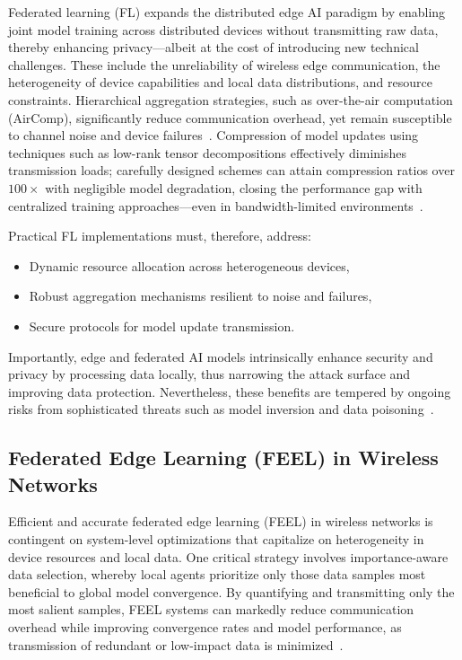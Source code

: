 Federated learning (FL) expands the distributed edge AI paradigm by enabling joint model training across distributed devices without transmitting raw data, thereby enhancing privacy—albeit at the cost of introducing new technical challenges. These include the unreliability of wireless edge communication, the heterogeneity of device capabilities and local data distributions, and resource constraints. Hierarchical aggregation strategies, such as over-the-air computation (AirComp), significantly reduce communication overhead, yet remain susceptible to channel noise and device failures~\cite{ref23}. Compression of model updates using techniques such as low-rank tensor decompositions effectively diminishes transmission loads; carefully designed schemes can attain compression ratios over $100\times$ with negligible model degradation, closing the performance gap with centralized training approaches—even in bandwidth-limited environments~\cite{ref23}.

Practical FL implementations must, therefore, address:
\begin{itemize}
    \item Dynamic resource allocation across heterogeneous devices,
    \item Robust aggregation mechanisms resilient to noise and failures,
    \item Secure protocols for model update transmission.
\end{itemize}

Importantly, edge and federated AI models intrinsically enhance security and privacy by processing data locally, thus narrowing the attack surface and improving data protection. Nevertheless, these benefits are tempered by ongoing risks from sophisticated threats such as model inversion and data poisoning~\cite{ref17,ref19,ref23,ref24}.

\subsection{Federated Edge Learning (FEEL) in Wireless Networks}

Efficient and accurate federated edge learning (FEEL) in wireless networks is contingent on system-level optimizations that capitalize on heterogeneity in device resources and local data. One critical strategy involves importance-aware data selection, whereby local agents prioritize only those data samples most beneficial to global model convergence. By quantifying and transmitting only the most salient samples, FEEL systems can markedly reduce communication overhead while improving convergence rates and model performance, as transmission of redundant or low-impact data is minimized~\cite{ref42}. 

